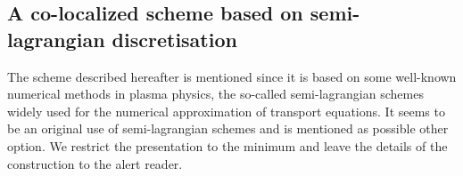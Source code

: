 %
\subsection{A co-localized scheme based on semi-lagrangian discretisation}


The scheme described hereafter is mentioned since it is based on some well-known 
numerical methods in plasma physics, the so-called semi-lagrangian schemes widely used for the numerical approximation of transport equations.
It seems to be an original use of semi-lagrangian schemes 
and is mentioned as possible other option. 
We restrict the presentation to the minimum and leave the details  of the construction to the alert reader.

